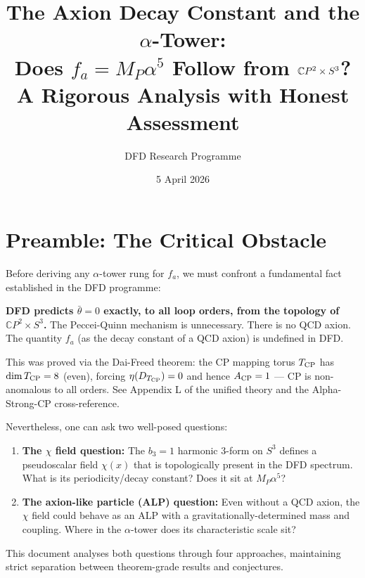 \documentclass[11pt]{article}
\title{The Axion Decay Constant and the $\alpha$-Tower:\\
Does $f_a = M_P \alpha^5$ Follow from $\CP^2 \times S^3$?\\[6pt]
\large A Rigorous Analysis with Honest Assessment}
\author{DFD Research Programme}
\date{5 April 2026}
\theoremstyle{definition}
\theoremstyle{remark}
\newcommand{\CP}{\mathbb{C}P}
\begin{document}
\maketitle

\section{Preamble: The Critical Obstacle}
\label{sec:preamble}

\begin{tcolorbox}[colback=red!5!white, colframe=red!70!black,
  title=\textbf{Critical Finding: DFD Predicts No QCD Axion}]
Before deriving any $\alpha$-tower rung for $f_a$, we must confront
a fundamental fact established in the DFD programme:

\textbf{DFD predicts $\bar\theta = 0$ exactly, to all loop orders, from
the topology of $\CP^2 \times S^3$.} The Peccei-Quinn mechanism is
unnecessary. There is no QCD axion. The quantity $f_a$ (as the decay
constant of a QCD axion) is undefined in DFD.

This was proved via the Dai-Freed theorem: the CP mapping torus
$T_{\rm CP}$ has $\dim T_{\rm CP} = 8$ (even), forcing $\eta(D_{T_{\rm CP}}) = 0$
and hence $A_{\rm CP} = 1$ --- CP is non-anomalous to all orders.
See Appendix L of the unified theory and the Alpha-Strong-CP cross-reference.
\end{tcolorbox}

Nevertheless, one can ask two well-posed questions:
\begin{enumerate}
\item \textbf{The $\chi$ field question:} The $b_3 = 1$ harmonic 3-form on $S^3$
  defines a pseudoscalar field $\chi(x)$ that is topologically present in the
  DFD spectrum. What is its periodicity/decay constant? Does it sit at
  $M_P \alpha^5$?

\item \textbf{The axion-like particle (ALP) question:} Even without a QCD axion,
  the $\chi$ field could behave as an ALP with a gravitationally-determined
  mass and coupling. Where in the $\alpha$-tower does its characteristic
  scale sit?
\end{enumerate}

This document analyses both questions through four approaches, maintaining
strict separation between theorem-grade results and conjectures.
\end{document}
